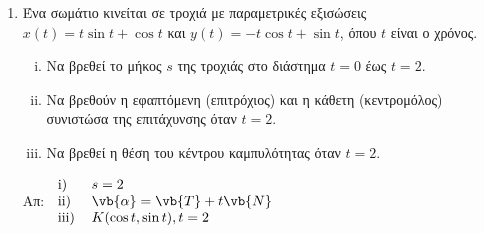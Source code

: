 \begin{enumerate}
\item Ένα σωμάτιο κινείται σε τροχιά με παραμετρικές εξισώσεις $x(t)=t\sin t + \cos t$ και $y(t)=-t\cos t+\sin t$, όπου $t$ είναι ο χρόνος.
\begin{enumerate}[i)]
  \item Να βρεθεί το μήκος $s$ της τροχιάς στο διάστημα $t=0$ έως $t=2$.
  \item Να βρεθούν η εφαπτόμενη (επιτρόχιος) και η κάθετη (κεντρομόλος) συνιστώσα της επιτάχυνσης όταν $t=2$.
  \item Να βρεθεί η θέση του κέντρου καμπυλότητας όταν $t=2$.
\end{enumerate}

\hfill Απ: $\begin{tabular}{>{$}l<{$}>{$}l<{$}}
  \rm{i)} & s=2 \\
  \rm{ii)} & \vb{\alpha}=\vb{T}+t\vb{N} \\
  \rm{iii)} & K(\cos t, \sin t), t=2
\end{tabular}$


\end{enumerate}




